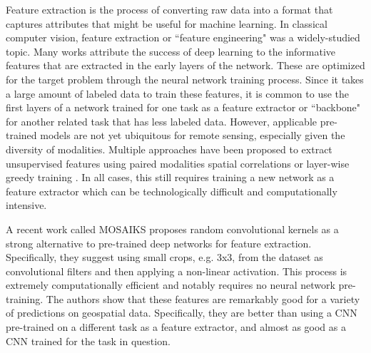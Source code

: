 
Feature extraction is the process of converting raw data into a format that captures attributes that might be useful for machine learning. In classical computer vision, feature extraction or ``feature engineering" was a widely-studied topic. Many works attribute the success of deep learning to the informative features that are extracted in the early layers of the network. These are optimized for the target problem through the neural network training process. Since it takes a large amount of labeled data to train these features, it is common to use the first layers of a network trained for one task as a feature extractor or ``backbone" for another related task that has less labeled data. However, applicable pre-trained models are not yet ubiquitous for remote sensing, especially given the diversity of modalities. Multiple approaches have been proposed to extract unsupervised features using paired modalities \cite{Xie2016TransferMapping} spatial correlations \cite{Jean2019Tile2Vec:Data} or layer-wise greedy training \cite{Romero2016UnsupervisedClassification}. In all cases, this still requires training a new network as a feature extractor which can be technologically difficult and computationally intensive.

A recent work called MOSAIKS \cite{Rolf2021} proposes random convolutional kernels as a strong alternative to pre-trained deep networks for feature extraction. Specifically, they suggest using small crops, e.g. 3x3, from the dataset as convolutional filters and then applying a non-linear activation. This process is extremely computationally efficient and notably requires no neural network pre-training. The authors show that these features are remarkably good for a variety of predictions on geospatial data. Specifically, they are better than using a CNN pre-trained on a different task as a feature extractor, and almost as good as a CNN trained for the task in question.


